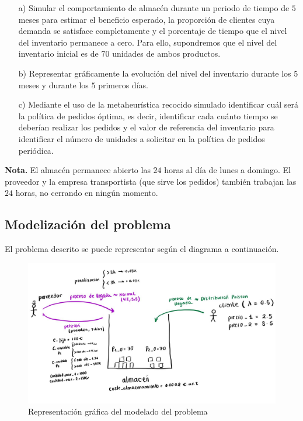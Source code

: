 \documentclass[a4paper,12pt]{article}
\begin{document}
	\begin{enumerate}
		\item[a)] Simular el comportamiento de almacén durante un periodo de tiempo de $5$ meses para estimar el beneficio esperado, la proporción de clientes cuya demanda se satisface completamente y el porcentaje de tiempo que el nivel del inventario permanece a cero. Para ello, supondremos que el nivel del inventario inicial es de $70$ unidades de ambos productos.

		\item[b)] Representar gráficamente la evolución del nivel del inventario durante los $5$ meses y durante los $5$ primeros días. 

		\item[c)] Mediante el uso de la metaheurística recocido simulado identificar cuál será la política de pedidos óptima, es decir, identificar cada cuánto tiempo se deberían realizar los pedidos y el valor de referencia del inventario para identificar el número de unidades a solicitar en la política de pedidos periódica.
	\end{enumerate}
	
	\textbf{Nota.} El almacén permanece abierto las $24$ horas al día de lunes a domingo. El proveedor y la empresa transportista (que sirve los pedidos) también trabajan las $24$ horas, no cerrando en ningún momento.

	\subsection{Modelización del problema}
	El problema descrito se puede representar según el diagrama a continuación.
	
	
	\begin{figure}[H]
		\centering
		\includegraphics[width=\textwidth]{include/modelo_almacen.png}
		\caption{Representación gráfica del modelado del problema}
	\end{figure}
	
\end{document}
